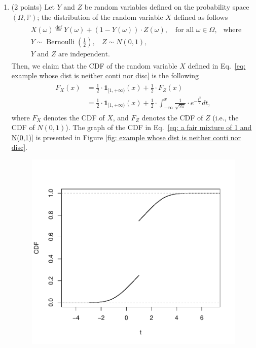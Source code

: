 \documentclass[11pt]{article}
\newcommand{\1}{\mathbb{1}}
\begin{document}
\begin{enumerate}
\item (2 points) Let $Y$ and $Z$ be random variables defined on the probability space $(\Omega,\mathbb{P})$; the distribution of the random variable $X$ defined as follows
\begin{align}\label{eq: example whose dist is neither conti nor disc}
    \begin{aligned}
    & X(\omega) \overset{\operatorname{def}}{=} Y(\omega)+(1-Y(\omega))\cdot Z(\omega), \ \ \ \text{ for all }\omega\in\Omega,\ \ \mbox{ where} \\
    & Y\sim \operatorname{Bernoulli}\left(\frac{1}{2}\right), \ \ \ \ Z\sim N(0,1), \\
    &\text{$Y$ and $Z$ are independent.}
    \end{aligned}
 \end{align}
Then, we claim that the CDF of the random variable $X$ defined in Eq.~\eqref{eq: example whose dist is neither conti nor disc} is the following
\begin{align}\label{eq: a fair mixture of 1 and N(0,1)}
    \begin{aligned}
        F_X(x) &=\frac{1}{2}\cdot\mathbf{1}_{[1,+\infty)}(x)+ \frac{1}{2}\cdot F_Z(x)\\
    &= \frac{1}{2}\cdot\mathbf{1}_{[1,+\infty)}(x)+ \frac{1}{2}\cdot \int_{-\infty}^x \frac{1}{\sqrt{2\pi}}\cdot e^{-\frac{t^2}{2}} dt,
    \end{aligned}
\end{align}
where $F_X$ denotes the CDF of $X$, and $F_Z$ denotes the CDF of $Z$ (i.e., the CDF of $N(0,1)$). The graph of the CDF in Eq.~\eqref{eq: a fair mixture of 1 and N(0,1)} is presented in Figure \ref{fig: example whose dist is neither conti nor disc}.
\begin{figure}
    \centering
    \includegraphics[scale=0.5]{example whose dist is neither conti nor disc.pdf}

\end{figure}
\end{enumerate}
\end{document}
